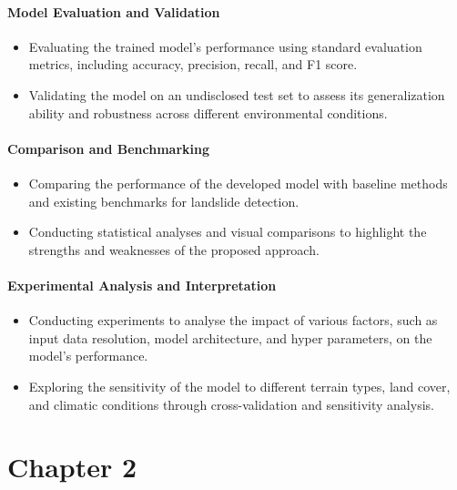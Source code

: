 \documentclass[12pt,a4paper]{report}
\begin{document}
\subsubsection*{Model Evaluation and Validation}

\begin{itemize}
    \item Evaluating the trained model's performance using standard evaluation metrics, including accuracy, precision, recall, and F1 score.
    
    \item Validating the model on an undisclosed test set to assess its generalization ability and robustness across different environmental conditions.
\end{itemize}

\subsubsection*{Comparison and Benchmarking}

\begin{itemize}
    \item Comparing the performance of the developed model with baseline methods and existing benchmarks for landslide detection.
    
    \item Conducting statistical analyses and visual comparisons to highlight the strengths and weaknesses of the proposed approach.
\end{itemize}

\subsubsection*{Experimental Analysis and Interpretation}

\begin{itemize}
    \item Conducting experiments to analyse the impact of various factors, such as input data resolution, model architecture, and hyper parameters, on the model's performance.
    
    \item Exploring the sensitivity of the model to different terrain types, land cover, and climatic conditions through cross-validation and sensitivity analysis.
\end{itemize}




	{\vfill \chapter*{\centering \vfill Chapter 2 \vfill}\vfill}
	\thispagestyle{empty}
	\newpage
	\label{Tools and Techniques Used}
\end{document}
